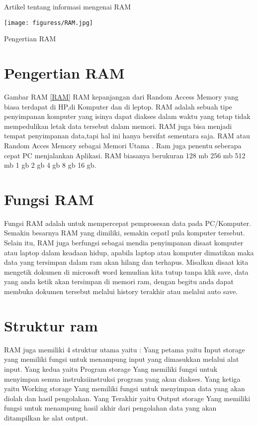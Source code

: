 ﻿%





Artikel tentang informasi mengenai RAM

  \begin{figuress}[ht]
  \centerline{\texttt{[image: figuress/RAM.jpg]}}
  \caption{Pengertian RAM}
  \label{RAM}
  \end{figuress}

\section{Pengertian RAM}
Gambar RAM \ref{RAM}
RAM kepanjangan dari Random Access Memory yang biasa terdapat di HP,di Komputer dan di leptop.
RAM adalah sebuah tipe penyimpanan komputer yang isinya dapat diakses dalam waktu yang tetap tidak mempedulikan letak data tersebut dalam memori.
RAM juga bisa menjadi tempat penyimpanan data,tapi hal ini hanya bersifat sementara saja.
RAM atau Random Acces Memory sebagai Memori Utama . Ram juga penentu seberapa cepat PC menjalankan Aplikasi.
RAM biasanya berukuran 128 mb 256 mb 512 mb 1 gb 2 gb 4 gb 8 gb 16 gb.

\section{Fungsi RAM}
Fungsi RAM adalah untuk mempercepat pemprosesan data pada PC/Komputer. Semakin besarnya RAM yang dimiliki, semakin cepatl pula komputer tersebut.
Selain itu, RAM juga berfungsi sebagai mendia penyimpanan disaat komputer atau laptop dalam keadaan hidup, apabila laptop atau komputer dimatikan maka data yang tersimpan dalam ram akan hilang dan terhapus. Misalkan disaat kita mengetik dokumen di microsoft word kemudian kita tutup tanpa klik save, data yang anda ketik akan tersimpan di memori ram, dengan begitu anda dapat membuka dokumen tersebut melalui history terakhir atau melalui auto save.

\section{Struktur ram}
RAM juga memiliki 4 struktur utama yaitu :
Yang petama yaitu Input storage yang memiliki fungsi untuk menampung input yang dimasukkan melalui alat input.
Yang kedua yaitu Program storage Yang memiliki fungsi untuk menyimpan semua instruksi\-instruksi program yang akan diakses.
Yang ketiga yaitu Working storage Yang memiliki fungsi untuk menyimpan data yang akan diolah dan hasil pengolahan.
Yang Terakhir yaitu Output storage Yang memiliki fungsi untuk menampung hasil akhir dari pengolahan data yang akan ditampilkan ke alat output.

